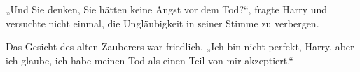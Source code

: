 „Und Sie denken, Sie hätten keine Angst vor dem Tod?“, fragte Harry und versuchte nicht einmal, die Ungläubigkeit in seiner Stimme zu verbergen.

Das Gesicht des alten Zauberers war friedlich. „Ich bin nicht perfekt, Harry, aber ich glaube, ich habe meinen Tod als einen Teil von mir akzeptiert.“

